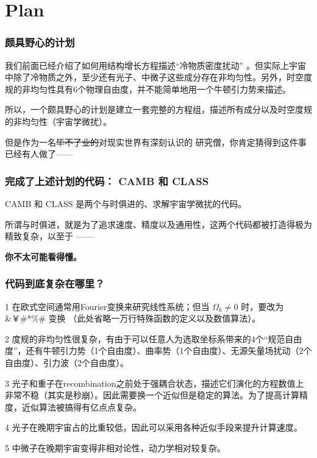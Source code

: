 \documentclass[CJK,13pt]{beamer}
\date{}
\begin{document}
  \bch

  \section{Plan}

  
  \begin{frame}

    \frametitle{颇具野心的计划}
    我们前面已经介绍了如何用结构增长方程描述“冷物质密度扰动” 。但实际上宇宙中除了冷物质之外，至少还有光子、中微子这些成分存在非均匀性。另外，时空度规的非均匀性具有6个物理自由度，并不能简单地用一个牛顿引力势来描述。


    \skipline

    所以，一个颇具野心的计划是建立一套完整的方程组，描述所有成分以及时空度规的非均匀性（宇宙学微扰）。

    \skipline
    
    但是作为一名\sout{毕不了业的}对现实世界有深刻认识的 研究僧，你肯定猜得到这件事已经有人做了——
  \end{frame}

  \begin{frame}
    \frametitle{完成了上述计划的代码： CAMB 和 CLASS}
    CAMB 和 CLASS 是两个与时俱进的、求解宇宙学微扰的代码。

    \skipline

    所谓与时俱进，就是为了追求速度、精度以及通用性，这两个代码都被打造得极为精致复杂，以至于 ——


    {\bf\large 你不太可能看得懂。}
  \end{frame}


  \begin{frame}
    \frametitle{代码到底复杂在哪里？}
    \bitem
  \item[1]{在欧式空间通常用Fourier变换来研究线性系统；但当 $\Omega_k\ne 0$ 时，要改为 \&￥\#*\%\# 变换 （此处省略一万行特殊函数的定义以及数值算法）。}
  \item[2]{度规的非均匀性很复杂，有由于可以任意人为选取坐标系带来的4个“规范自由度”，还有牛顿引力势（1个自由度）、曲率势（1个自由度）、无源矢量场扰动（2个自由度）、引力波（2个自由度）。}
  \item[3]{光子和重子在recombination之前处于强耦合状态，描述它们演化的方程数值上非常不稳（其实是秒崩）。因此需要换一个近似但是稳定的算法。为了提高计算精度，近似算法被搞得有亿点点复杂。}    
  \item[4]{光子在晚期宇宙占的比重较低，因此可以采用各种近似手段来提升计算速度。}
  \item[5]{中微子在晚期宇宙变得非相对论性，动力学相对较复杂。}
    \eitem
  \end{frame}
\end{document}
